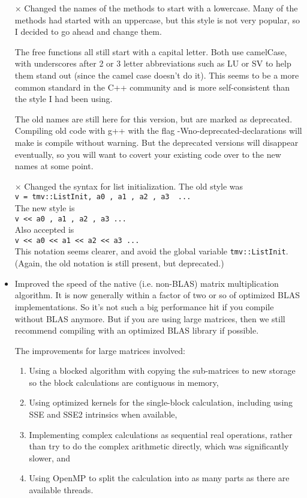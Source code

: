 \documentclass[twoside,letterpaper,11pt]{article}
\renewcommand{\tt}[1]{{\lstinline {#1}}}
\begin{document}
\begin{description}
\begin{itemize}

\item[$\times$]
Changed the names of the methods to start with a lowercase.
Many of the methods had started with an uppercase, but this style
is not very popular, so I decided to go ahead and change them.

The free functions all still start with a capital letter.
Both use camelCase, with underscores after 2 or 3 letter abbreviations
such as LU or SV to help them stand out (since the camel case doesn't do it).
This seems to be a more common standard in the C++ community and is more
self-consistent than the style I had been using.

The old names are still here for this version, but are marked as deprecated.
Compiling old code with g++ with the flag -Wno-deprecated-declarations
will make is compile without warning.
But the deprecated versions will disappear eventually, so you will want to
covert your existing code over to the new names at some point.

\item[$\times$]
Changed the syntax for list initialization.
The old style was \\
\tt{v = tmv::ListInit, a0 , a1 , a2 , a3  ...}\\
The new style is \\
\tt{v << a0 , a1 , a2 , a3 ...}\\
Also accepted is \\
\tt{v << a0 << a1 << a2 << a3 ...}\\
This notation seems clearer, and avoid the global variable \tt{tmv::ListInit}.
(Again, the old notation is still present, but deprecated.)

\item
Improved the speed of the native (i.e. non-BLAS) matrix multiplication algorithm.
It is now generally within a factor of two or so of optimized BLAS implementations.
So it's not such a big performance hit if you compile without BLAS anymore.
But if you are using large matrices, then we still recommend compiling with 
an optimized BLAS library if possible.

The improvements for large matrices involved:
\begin{enumerate}
\item Using a blocked algorithm with copying the 
sub-matrices to new storage so the block calculations are contiguous in memory,
\item Using optimized kernels for the single-block calculation, including using
SSE and SSE2 intrinsics when available,
\item Implementing complex calculations
as sequential real operations, rather than try to do the complex arithmetic
directly, which was significantly slower, and
\item Using OpenMP to split the 
calculation into as many parts as there are available threads.
\end{enumerate}


\end{itemize}
\end{description}
\end{document}
